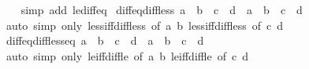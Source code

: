 \begin{isabellebody}
%
\isadelimproof
\ \ %
\endisadelimproof
%
\isatagproof
{}\isamarkupfalse%
\ {\isacharparenleft}{\kern0pt}simp\ add{\isacharcolon}{\kern0pt}\ le{\isacharunderscore}{\kern0pt}diff{\isacharunderscore}{\kern0pt}eq{\isacharparenright}{\kern0pt}%
\endisatagproof
{\isafoldproof}%
%
\isadelimproof
\isanewline
%
\endisadelimproof
\isanewline
{}\isamarkupfalse%
\ diff{\isacharunderscore}{\kern0pt}eq{\isacharunderscore}{\kern0pt}diff{\isacharunderscore}{\kern0pt}less{\isacharcolon}{\kern0pt}\ {\isachardoublequoteopen}a\ {\isacharminus}{\kern0pt}\ b\ {\isacharequal}{\kern0pt}\ c\ {\isacharminus}{\kern0pt}\ d\ {\isasymLongrightarrow}\ a\ {\isacharless}{\kern0pt}\ b\ {\isasymlongleftrightarrow}\ c\ {\isacharless}{\kern0pt}\ d{\isachardoublequoteclose}\isanewline
%
\isadelimproof
\ \ %
\endisadelimproof
%
\isatagproof
{}\isamarkupfalse%
\ {\isacharparenleft}{\kern0pt}auto\ simp\ only{\isacharcolon}{\kern0pt}\ less{\isacharunderscore}{\kern0pt}iff{\isacharunderscore}{\kern0pt}diff{\isacharunderscore}{\kern0pt}less{\isacharunderscore}{\kern0pt}{}\ {\isacharbrackleft}{\kern0pt}of\ a\ b{\isacharbrackright}{\kern0pt}\ less{\isacharunderscore}{\kern0pt}iff{\isacharunderscore}{\kern0pt}diff{\isacharunderscore}{\kern0pt}less{\isacharunderscore}{\kern0pt}{}\ {\isacharbrackleft}{\kern0pt}of\ c\ d{\isacharbrackright}{\kern0pt}{\isacharparenright}{\kern0pt}%
\endisatagproof
{\isafoldproof}%
%
\isadelimproof
\isanewline
%
\endisadelimproof
\isanewline
{}\isamarkupfalse%
\ diff{\isacharunderscore}{\kern0pt}eq{\isacharunderscore}{\kern0pt}diff{\isacharunderscore}{\kern0pt}less{\isacharunderscore}{\kern0pt}eq{\isacharcolon}{\kern0pt}\ {\isachardoublequoteopen}a\ {\isacharminus}{\kern0pt}\ b\ {\isacharequal}{\kern0pt}\ c\ {\isacharminus}{\kern0pt}\ d\ {\isasymLongrightarrow}\ a\ {\isasymle}\ b\ {\isasymlongleftrightarrow}\ c\ {\isasymle}\ d{\isachardoublequoteclose}\isanewline
%
\isadelimproof
\ \ %
\endisadelimproof
%
\isatagproof
{}\isamarkupfalse%
\ {\isacharparenleft}{\kern0pt}auto\ simp\ only{\isacharcolon}{\kern0pt}\ le{\isacharunderscore}{\kern0pt}iff{\isacharunderscore}{\kern0pt}diff{\isacharunderscore}{\kern0pt}le{\isacharunderscore}{\kern0pt}{}\ {\isacharbrackleft}{\kern0pt}of\ a\ b{\isacharbrackright}{\kern0pt}\ le{\isacharunderscore}{\kern0pt}iff{\isacharunderscore}{\kern0pt}diff{\isacharunderscore}{\kern0pt}le{\isacharunderscore}{\kern0pt}{}\ {\isacharbrackleft}{\kern0pt}of\ c\ d{\isacharbrackright}{\kern0pt}{\isacharparenright}{\kern0pt}%
\endisatagproof

\end{isabellebody}
